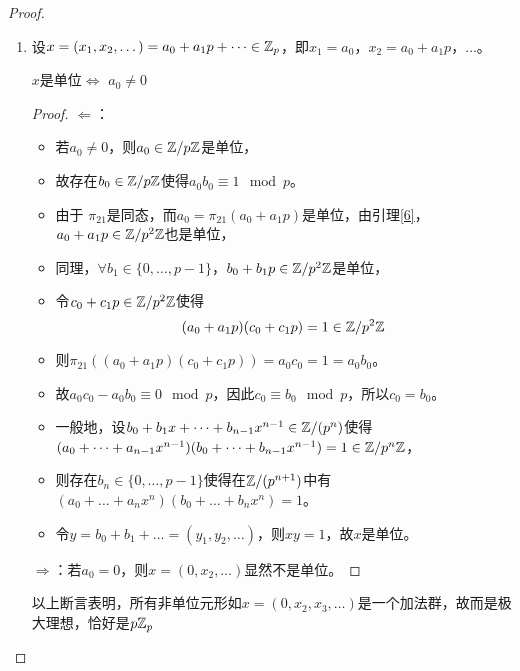 \documentclass[11pt]{article}
\begin{document}
\begin{proof}
\begin{enumerate}
\item 设\(x=(x_1,x_2,\dots)=a_0+a_1p+\dots\in\mathbb{Z}_p\)，即\(x_1=a_0\)，\(x_2=a_0+a_1p\)，\(\dots\)。

\begin{claim}
\(x\)是单位\(\Leftrightarrow\) \(a_0\neq 0\)
\end{claim}

\begin{proof}
\(\Leftarrow\)：
\begin{itemize}
\item 若\(a_0\neq 0\)，则\(a_0\in\mathbb{Z}/p\mathbb{Z}\)是单位，
\item 故存在\(b_0\in\mathbb{Z}/p\mathbb{Z}\)使得\(a_0b_0\equiv 1\mod p\)。
\item 由于 \(\pi_{21}\)是同态，而\(a_0=\pi_{21}(a_0+a_1p)\)是单位，由引理\ref{6}，\(a_0+a_1p\in\mathbb{Z}/p^2\mathbb{Z}\)也是单位，
\item 同理，\(\forall b_1\in\{0,\dots,p-1\}\)，\(b_0+b_1p\in\mathbb{Z}/p^2\mathbb{Z}\)是单位，
\item 令\(c_0+c_1p\in\mathbb{Z}/p^2\mathbb{Z}\)使得
\begin{equation*}
(a_0+a_1p)(c_0+c_1p)=1\in\mathbb{Z}/p^2\mathbb{Z}
\end{equation*}
\item 则\(\pi_{21}((a_0+a_1p)(c_0+c_1p))=a_0c_0=1=a_0b_0\)。
\item 故\(a_0c_0-a_0b_0\equiv 0\mod p\)，因此\(c_0\equiv b_0\mod p\)，所以\(c_0=b_0\)。
\item 一般地，设\(b_0+b_1x+\dots+b_{n-1}x^{n-1}\in\mathbb{Z}/(p^n)\)使得
\((a_0+\dots+a_{n-1}x^{n-1})(b_0+\dots+b_{n-1}x^{n-1})=1\in\mathbb{Z}/p^n\mathbb{Z}\)，
\item 则存在\(b_n\in\{0,\dots,p-1\}\)使得在\(\mathbb{Z}/(p^{n+1})\)中有
\((a_0+\dots+a_nx^n)(b_0+\dots+b_nx^n)=1\)。
\item 令\(y=b_0+b_1+\dots=(y_1,y_2,\dots)\)，则\(xy=1\)，故\(x\)是单位。
\end{itemize}

\(\Rightarrow\)：若\(a_0=0\)，则\(x=(0,x_2,\dots)\)显然不是单位。
\end{proof}

以上断言表明，所有非单位元形如\(x=(0,x_2,x_3,\dots)\)是一个加法群，故而是极大理想，恰好是\(p\mathbb{Z}_p\)


\end{enumerate}
\end{proof}
\end{document}
